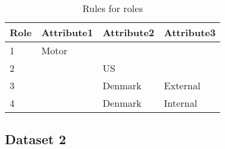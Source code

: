 		\begin{table}[H]
			\centering
			\caption{Rules for roles}
			\label{tab:dataset1_rules}
			\begin{tabular}{|l|l|l|l|}
				\hline
				\rowcolor[HTML]{EFEFEF} 
				Role & Attribute1 & Attribute2 & Attribute3 \\ \hline
				1    & Motor      &            &            \\ \hline
				2    &            & US         &            \\ \hline
				3    &            & Denmark    & External   \\ \hline
				4    &            & Denmark    & Internal   \\ \hline
			\end{tabular}
		\end{table}
		
	\subsection{Dataset 2}
	
